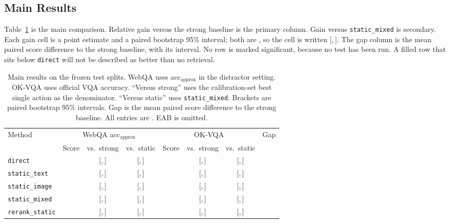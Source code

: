 \subsection{Main Results}
\label{sec:main}
Table~\ref{tab:main} is the main comparison.
Relative gain versus the strong baseline is the primary column.
Gain versus \texttt{static\_mixed} is secondary.
Each gain cell is a point estimate and a paired bootstrap 95\% interval; both are \ph{}, so the cell is written \ph{} [\ph{},\,\ph{}].
The gap column is the mean paired score difference to the strong baseline, with its interval.
No row is marked significant, because no test has been run.
A filled row that sits below \texttt{direct} will not be described as better than no retrieval.

\begin{table}[t]
\caption{Main results on the frozen test splits.
WebQA uses acc$_{\mathrm{approx}}$ in the distractor setting.
OK-VQA uses official VQA accuracy.
``Versus strong'' uses the calibration-set best single action as the denominator.
``Versus static'' uses \texttt{static\_mixed}.
Brackets are paired bootstrap 95\% intervals.
Gap is the mean paired score difference to the strong baseline.
All entries are \ph{}.
EAB is omitted.}
\label{tab:main}
\scriptsize
\setlength{\tabcolsep}{2.4pt}
\begin{tabular}{@{}lccccccc@{}}
\toprule
Method & \multicolumn{3}{c}{WebQA acc$_{\mathrm{approx}}$} & \multicolumn{3}{c}{OK-VQA} & Gap \\
\cmidrule(lr){2-4}\cmidrule(lr){5-7}
 & Score & vs.\ strong & vs.\ static & Score & vs.\ strong & vs.\ static & \\
\midrule
\texttt{direct} & \ph{} & \ph{} [\ph{},\,\ph{}] & \ph{} [\ph{},\,\ph{}] & \ph{} & \ph{} [\ph{},\,\ph{}] & \ph{} [\ph{},\,\ph{}] & \ph{} \\
\texttt{static\_text} & \ph{} & \ph{} [\ph{},\,\ph{}] & \ph{} [\ph{},\,\ph{}] & \ph{} & \ph{} [\ph{},\,\ph{}] & \ph{} [\ph{},\,\ph{}] & \ph{} \\
\texttt{static\_image} & \ph{} & \ph{} [\ph{},\,\ph{}] & \ph{} [\ph{},\,\ph{}] & \ph{} & \ph{} [\ph{},\,\ph{}] & \ph{} [\ph{},\,\ph{}] & \ph{} \\
\texttt{static\_mixed} & \ph{} & \ph{} [\ph{},\,\ph{}] & \ph{} [\ph{},\,\ph{}] & \ph{} & \ph{} [\ph{},\,\ph{}] & \ph{} [\ph{},\,\ph{}] & \ph{} \\
\texttt{rerank\_static} & \ph{} & \ph{} [\ph{},\,\ph{}] & \ph{} [\ph{},\,\ph{}] & \ph{} & \ph{} [\ph{},\,\ph{}] & \ph{} [\ph{},\,\ph{}] & \ph{} \\

\end{tabular}
\end{table}
